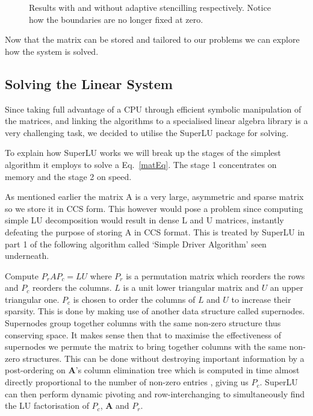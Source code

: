 \documentclass[a4paper]{article}
\newcommand{\mat}[1]{\mathbf{#1}}
\begin{document}
\begin{figure}
  \centering
{}\hfill
{}
  \caption{Results with and without adaptive stencilling respectively. Notice 
how the boundaries are no longer fixed at zero.}
\end{figure}

Now that the matrix can be stored and tailored to our problems we can explore
how the system is solved.

\subsection{Solving the Linear System}
Since taking full advantage of a CPU through efficient symbolic manipulation of
the matrices, and linking the algorithms to a specialised linear algebra
library is a very challenging task, we decided to utilise the SuperLU package
for solving.

To explain how SuperLU works we will break up the stages of the simplest
algorithm it employs to solve a Eq.~\eqref{matEq}. The stage 1
concentrates on memory and the stage 2 on speed.

As mentioned earlier the matrix A is a very large, asymmetric and sparse  
matrix so we store it in CCS form. This however would pose a problem since 
computing simple LU decomposition would result in dense L and U matrices, 
instantly defeating the purpose of storing A in CCS format. This is treated by 
SuperLU in part 1 of the following algorithm called `Simple Driver Algorithm'
seen underneath.

Compute $P_rAP_c = LU$ where $P_r$ is a permutation matrix which reorders the 
rows and $P_c$ reorders the columns. $L$ is a unit lower triangular matrix and
$U$ an upper triangular one.
$P_c$ is chosen to order the columns of $L$ and $U$ to increase their sparsity. 
This is done by making use of another data structure called supernodes. 
Supernodes group together columns with the same non-zero structure thus 
conserving space. It makes sense then that to maximise the effectiveness of 
supernodes we permute the matrix to bring together columns with the same 
non-zero structures. This can be done without destroying important 
information by a post-ordering on $\mat{A}$'s column elimination tree \cite{ref27}
which is computed in time almost directly proportional to the number of
non-zero entries \cite{ref35}, giving us $P_c$. SuperLU can then perform
dynamic pivoting and row-interchanging to simultaneously find the LU
factorisation of $P_c$, $\mat{A}$ and $P_r$.
\end{document}
